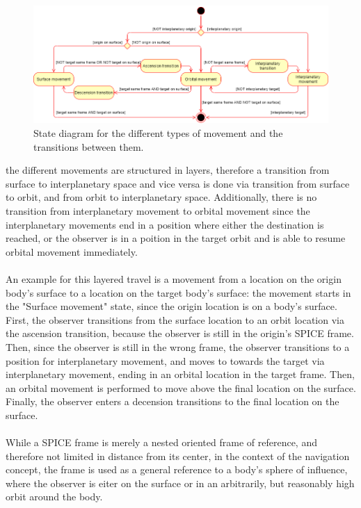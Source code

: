 \begin{figure}[h]
    \centering
    \includegraphics[width=\textwidth]{content/4_3_autoNavigation/img/NavigationStateDiagram}
    \caption{State diagram for the different types of movement and the transitions between them.}
    \label{fig:nav-states}
\end{figure}

the different movements are structured in layers, therefore a transition from surface to interplanetary space and
vice versa is done via transition from surface to orbit, and from orbit to interplanetary space.
Additionally, there is no transition from interplanetary movement to orbital movement since the interplanetary
movements end in a position where either the destination is reached, or the observer is in a poition in the target
orbit and is able to resume orbital movement immediately.
\\
\\
An example for this layered travel is a movement from a location on the origin body's surface to a location on the
target body's surface:
the movement starts in the "Surface movement" state, since the origin location is on a body's surface.
First, the observer transitions from the surface location to an orbit location via the ascension transition, because
the observer is still in the origin's SPICE frame.
Then, since the observer is still in the wrong frame, the observer transitions to a position for interplanetary
movement, and moves to towards the target via interplanetary movement, ending in an orbital location in the target
frame.
Then, an orbital movement is performed to move above the final location on the surface.
Finally, the observer enters a decension transitions to the final location on the surface.
\\
\\
While a SPICE frame is merely a nested oriented frame of reference, and therefore not limited in distance from its
center, in the context of the navigation concept, the frame is used as a general reference to a body's sphere of
influence, where the observer is eiter on the surface or in an arbitrarily, but reasonably high orbit around the body.

